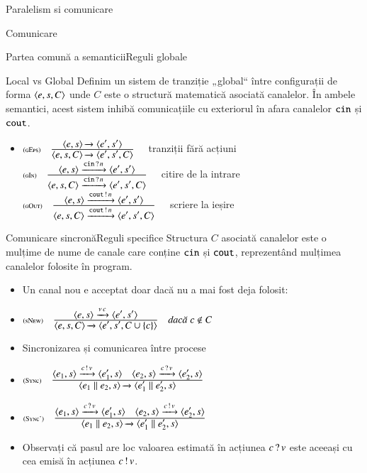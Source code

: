 \documentclass[xcolor=pdftex,romanian,colorlinks]{beamer}
\begin{document}
\begin{section}{Paralelism si comunicare}
\begin{subsection}{Comunicare}
\begin{frame}{Partea comună a semanticii}{Reguli globale}
\begin{block}{Local vs Global}
Definim un sistem de tranziție „global“ între configurații de forma
${\langle{e,s,C}\rangle}$ unde $C$ este o structură matematică asociată canalelor.  În ambele semantici, acest sistem inhibă comunicațiile cu exteriorul în afara canalelor $\mathrel{\text{\ttfamily cin}}$ și $\mathrel{\text{\ttfamily cout}}$.
\end{block}
\begin{itemize}
\item[] $\reg[gEps]{\Ss{\c{e,s,C}}{\c{e',s',C}}}{\Ss{\c{e,s}}{\c{e',s'}}}{}$
\hfill tranziții fără acțiuni
\vitem[] $\reg[gIn]{\Ss[\Arcv{\Scin}{n}]{\c{e,s,C}}{\c{e',s',C}}}{\Ss[\Arcv{\Scin}{n}]{\c{e,s}}{\c{e',s'}}}{}$
\hfill citire de la intrare
\vitem[] $\reg[gOut]{\Ss[\Asnd{\Scout}{n}]{\c{e,s,C}}{\c{e',s',C}}}{\Ss[\Asnd{\Scout}{n}]{\c{e,s}}{\c{e',s'}}}{}$
\hfill scriere la ieșire
\end{itemize}

\end{frame}

\begin{frame}{Comunicare sincronă}{Reguli specifice}
Structura $C$ asociată canalelor este o mulțime de nume de canale care conține $\mathrel{\text{\ttfamily cin}}$ și $\mathrel{\text{\ttfamily cout}}$, reprezentând mulțimea canalelor folosite în program.
\begin{itemize}
\item Un canal nou e acceptat doar dacă nu a mai fost deja folosit:
\item[] $\reg[sNew]{\Ss{\c{e,s,C}}{\c{e',s',C\cup \{c\}}}}{\Ss[\Anew{c}]{\c{e,s}}{\c{e',s'}}}{c\not\in C}$
\item Sincronizarea și comunicarea între procese
\item[] $\reg[Sync]{\Ss{\c{e_1\Spar e_2,s}}{\c{e_1'\Spar e_2',s}}}{\Ss[\Asnd{c}{v}]{\c{e_1,s}}{\c{e_1',s}} \si \Ss[\Arcv{c}{v}]{\c{e_2,s}}{\c{e_2',s}}}{}$
\item[] $\reg[Sync']{\Ss{\c{e_1\Spar e_2,s}}{\c{e_1'\Spar e_2',s}}}{\Ss[\Arcv{c}{v}]{\c{e_1,s}}{\c{e_1',s}} \si \Ss[\Asnd{c}{v}]{\c{e_2,s}}{\c{e_2',s}}}{}$
\item Observați că pasul are loc  valoarea estimată în acțiunea $c\,?\,v$ este aceeași cu cea emisă în acțiunea $c\,!\,v$.
\end{itemize}
\end{frame}


\end{subsection}
\end{section}
\end{document}
